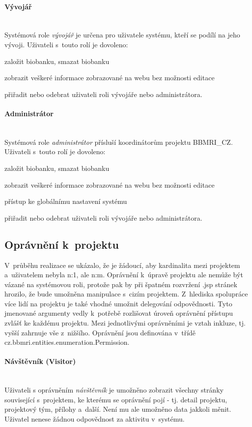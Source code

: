 \documentclass[11pt,draft,oneside]{fithesis2}
\newcommand{\paragraphNewLine}[1]{\paragraph*{#1}\mbox{}\\}
\newcommand{\ProjectName}{BBMRI\_CZ\xspace}
\begin{document}
\paragraphNewLine{Vývojář}
Systémová role \textit{vývojář} je určena pro uživatele systému, kteří se podílí na jeho vývoji.
Uživateli s~touto rolí je dovoleno:
\begin{compactitem}
	\item založit biobanku, smazat biobanku
	\item zobrazit veškeré informace zobrazované na webu bez možnosti editace
	\item přiřadit nebo odebrat uživateli roli vývojáře nebo administrátora.
\end{compactitem}

\paragraphNewLine{Administrátor}
Systémová role \textit{administrátor} přísluší koordinátorům projektu \ProjectName.
Uživateli s~touto rolí je dovoleno:
\begin{compactitem}
	\item založit biobanku, smazat biobanku
	\item zobrazit veškeré informace zobrazované na webu bez možnosti editace
	\item přístup ke globálnímu nastavení systému
	\item přiřadit nebo odebrat uživateli roli vývojáře nebo administrátora.
\end{compactitem}

\subsection{Oprávnění k~projektu}
V~průběhu realizace se ukázalo, že je žádoucí, aby kardinalita mezi projektem a~uživatelem nebyla n:1, ale n:m. Oprávnění k~úpravě projektu ale nemůže být vázané na systémovou roli, protože pak by při špatném rozvržení .jsp stránek hrozilo, že bude umožněna manipulace s~cizím projektem. Z~hlediska spolupráce více lidí na projektu je také vhodné umožnit delegování odpovědnosti. Tyto jmenované argumenty vedly k~potřebě rozlišovat úroveň oprávnění přístupu zvlášť ke každému projektu.
Mezi jednotlivými oprávněními je vztah inkluze, tj. vyšší zahrnuje vše z~nižšího. Oprávnění jsou definována v~třídě cz.bbmri.entities.enumeration.Permission.

\paragraphNewLine{Návštěvník (Visitor)} 
Uživateli s oprávněním \textit{návštěvník} je umožněno zobrazit všechny stránky související s~projektem, ke kterému se oprávnění pojí - tj. detail projektu, projektový tým, přílohy a~další. Není mu ale umožněno data jakkoli měnit. Uživatel nenese žádnou odpovědnost za aktivitu v~systému.
\end{document}
